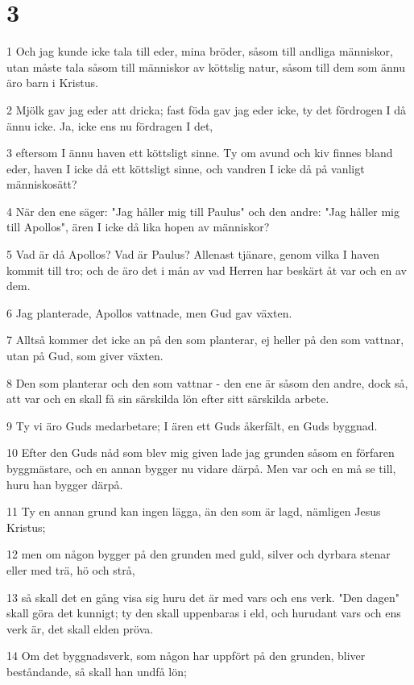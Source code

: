 \chapter{3}

\par 1 Och jag kunde icke tala till eder, mina bröder, såsom till andliga människor, utan måste tala såsom till människor av köttslig natur, såsom till dem som ännu äro barn i Kristus.
\par 2 Mjölk gav jag eder att dricka; fast föda gav jag eder icke, ty det fördrogen I då ännu icke. Ja, icke ens nu fördragen I det,
\par 3 eftersom I ännu haven ett köttsligt sinne. Ty om avund och kiv finnes bland eder, haven I icke då ett köttsligt sinne, och vandren I icke då på vanligt människosätt?
\par 4 När den ene säger: "Jag håller mig till Paulus" och den andre: "Jag håller mig till Apollos", ären I icke då lika hopen av människor?
\par 5 Vad är då Apollos? Vad är Paulus? Allenast tjänare, genom vilka I haven kommit till tro; och de äro det i mån av vad Herren har beskärt åt var och en av dem.
\par 6 Jag planterade, Apollos vattnade, men Gud gav växten.
\par 7 Alltså kommer det icke an på den som planterar, ej heller på den som vattnar, utan på Gud, som giver växten.
\par 8 Den som planterar och den som vattnar - den ene är såsom den andre, dock så, att var och en skall få sin särskilda lön efter sitt särskilda arbete.
\par 9 Ty vi äro Guds medarbetare; I ären ett Guds åkerfält, en Guds byggnad.
\par 10 Efter den Guds nåd som blev mig given lade jag grunden såsom en förfaren byggmästare, och en annan bygger nu vidare därpå. Men var och en må se till, huru han bygger därpå.
\par 11 Ty en annan grund kan ingen lägga, än den som är lagd, nämligen Jesus Kristus;
\par 12 men om någon bygger på den grunden med guld, silver och dyrbara stenar eller med trä, hö och strå,
\par 13 så skall det en gång visa sig huru det är med vars och ens verk. "Den dagen" skall göra det kunnigt; ty den skall uppenbaras i eld, och hurudant vars och ens verk är, det skall elden pröva.
\par 14 Om det byggnadsverk, som någon har uppfört på den grunden, bliver beståndande, så skall han undfå lön;
